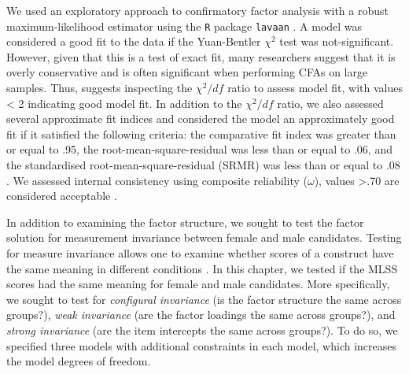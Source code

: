 \documentclass[
  12pt,
  a4paper,
]{book}
\begin{document}
We used an exploratory approach to confirmatory factor analysis with a robust maximum-likelihood estimator using the \texttt{R} package \texttt{lavaan} \citep{R-lavaan}. A model was considered a good fit to the data if the Yuan-Bentler \citep[Y-B;][]{Yuan1997} \(\chi^2\) test was not-significant. However, given that this is a test of exact fit, many researchers suggest that it is overly conservative and is often significant when performing CFAs on large samples. Thus, \citet{Joreskog1989} suggests inspecting the \(\chi^2/df\) ratio to assess model fit, with values \textless{} 2 indicating good model fit. In addition to the \(\chi^2/df\) ratio, we also assessed several approximate fit indices and considered the model an approximately good fit if it satisfied the following criteria: the comparative fit index \citep[CFI;][]{Bentler1990} was greater than or equal to .95, the root-mean-square-residual \citep[RMSEA;][]{Steiger1990} was less than or equal to .06, and the standardised root-mean-square-residual (SRMR) was less than or equal to .08 \citep{Hu1999}. We assessed internal consistency using composite reliability (\(\omega\)), values \textgreater.70 are considered acceptable \citep{Fornell1981}.

In addition to examining the factor structure, we sought to test the factor solution for measurement invariance between female and male candidates. Testing for measure invariance allows one to examine whether scores of a construct have the same meaning in different conditions \citep{Meade2004}. In this chapter, we tested if the MLSS scores had the same meaning for female and male candidates. More specifically, we sought to test for \emph{configural invariance} (is the factor structure the same across groups?), \emph{weak invariance} (are the factor loadings the same across groups?), and \emph{strong invariance} (are the item intercepts the same across groups?). To do so, we specified three models with additional constraints in each model, which increases the model degrees of freedom.
\end{document}
